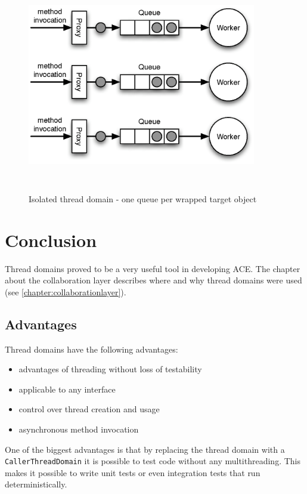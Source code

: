 \begin{figure}[H]
 \centering
 \includegraphics[width=10cm,height=9.4cm]{../images/finalreport/threaddomain_isolated.eps}
 \caption{Isolated thread domain - one queue per wrapped target object}
\end{figure}



\section{Conclusion}

Thread domains proved to be a very useful tool in developing ACE. The
chapter about the collaboration layer describes where and why thread
domains were used (see \ref{chapter:collaborationlayer}).


\subsection{Advantages}
Thread domains have the following advantages:

\begin{itemize}
 \item advantages of threading without loss of testability
 \item applicable to any interface
 \item control over thread creation and usage
 \item asynchronous method invocation
\end{itemize}

One of the biggest advantages is that by replacing the thread domain with
a \texttt{CallerThreadDomain} it is possible to test code without any
multithreading. This makes it possible to write unit tests or even 
integration tests that run deterministically.

